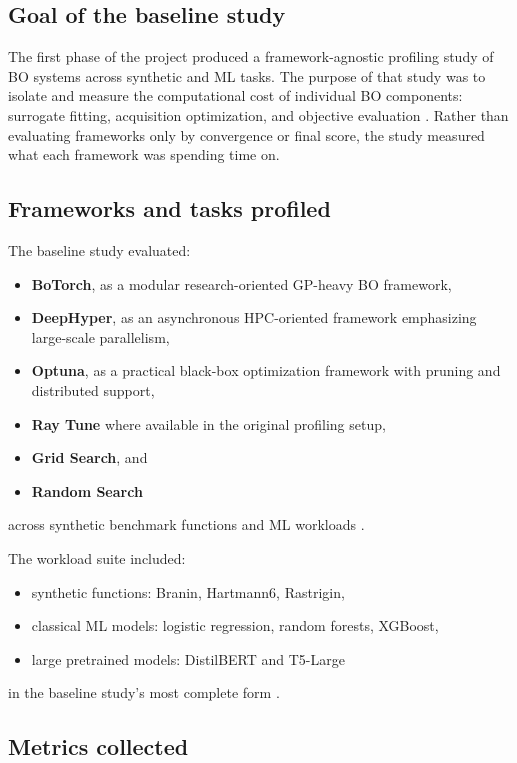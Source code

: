 \documentclass[11pt]{article}
\begin{document}
\subsection{Goal of the baseline study}

The first phase of the project produced a framework-agnostic profiling study of BO systems across synthetic and ML tasks. The purpose of that study was to isolate and measure the computational cost of individual BO components: surrogate fitting, acquisition optimization, and objective evaluation \cite{oumer2026baseline}. Rather than evaluating frameworks only by convergence or final score, the study measured what each framework was spending time on.

\subsection{Frameworks and tasks profiled}

The baseline study evaluated:
\begin{itemize}[leftmargin=1.5em]
    \item \textbf{BoTorch}, as a modular research-oriented GP-heavy BO framework,
    \item \textbf{DeepHyper}, as an asynchronous HPC-oriented framework emphasizing large-scale parallelism,
    \item \textbf{Optuna}, as a practical black-box optimization framework with pruning and distributed support,
    \item \textbf{Ray Tune} where available in the original profiling setup,
    \item \textbf{Grid Search}, and
    \item \textbf{Random Search}
\end{itemize}
across synthetic benchmark functions and ML workloads \cite{oumer2026baseline}.

The workload suite included:
\begin{itemize}[leftmargin=1.5em]
    \item synthetic functions: Branin, Hartmann6, Rastrigin,
    \item classical ML models: logistic regression, random forests, XGBoost,
    \item large pretrained models: DistilBERT and T5-Large
\end{itemize}
in the baseline study's most complete form \cite{oumer2026baseline}.

\subsection{Metrics collected}
\end{document}
